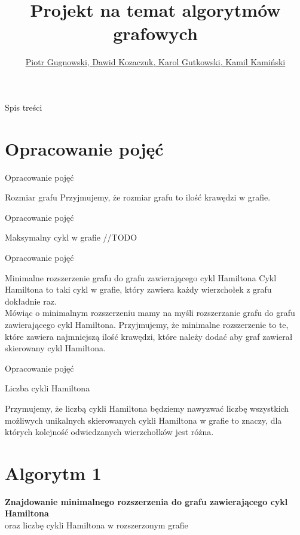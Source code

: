 \documentclass{beamer}
\author{\href{}{Piotr Gugnowski, Dawid Kozaczuk, Karol Gutkowski, Kamil Kamiński}}
\institute{\href{}{Teoria Algorytmów i Obliczeń}}
\title{Projekt na temat algorytmów grafowych}
\date{}
\begin{document}
\begin{frame}
  \titlepage
\end{frame}

\begin{frame}{Spis treści}
\small %
    \tableofcontents %
\end{frame}

\section{Opracowanie pojęć}
\begin{frame}{Opracowanie pojęć}
\begin{block}{Rozmiar grafu}
    Przyjmujemy, że rozmiar grafu to ilość krawędzi w grafie.    
\end{block}
\end{frame}

\begin{frame}{Opracowanie pojęć}
\begin{block}{Maksymalny cykl w grafie}
    //TODO   
\end{block}
\end{frame}

\begin{frame}{Opracowanie pojęć}
\begin{block}{Minimalne rozszerzenie grafu do grafu zawierającego cykl Hamiltona}
Cykl Hamiltona to taki cykl w grafie, który zawiera każdy wierzchołek z grafu dokładnie raz.  \\
    Mówiąc o minimalnym rozszerzeniu mamy na myśli rozszerzanie grafu do grafu zawierającego cykl Hamiltona. Przyjmujemy, że minimalne rozszerzenie to te, które zawiera najmniejszą ilość krawędzi, które należy dodać aby graf zawierał skierowany cykl Hamiltona.   
\end{block}
\end{frame}

\begin{frame}{Opracowanie pojęć}
\begin{block}{Liczba cykli Hamiltona}
    
    Przymujemy, że liczbą cykli Hamiltona będziemy nawyzwać liczbę wszystkich możliwych unikalnych skierowanych cykli Hamiltona w grafie to znaczy, dla których kolejność odwiedzanych wierzchołków jest różna.    
\end{block}
\end{frame}

\section{Algorytm 1}
\begin{frame}
  \centering
  \vspace{2cm} %
  \Huge \textbf{Znajdowanie minimalnego rozszerzenia do grafu zawierającego cykl Hamiltona} \\
  \vspace{1cm}
  \Large oraz liczbę cykli Hamiltona w rozszerzonym grafie
\end{frame}
\end{document}

